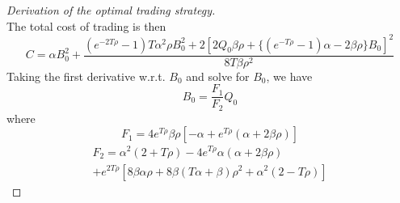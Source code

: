 \documentclass{article}
\begin{document}
\begin{proof}[Derivation of the optimal trading strategy]
\[  \]
  The total cost of trading is then
  \[
    C = \alpha B_0^2 + \frac{(e^{-2 T \rho} - 1) T \alpha^2 \rho B_0^2 + 2 [2 Q_0 \beta \rho + \{(e^{-T \rho} - 1) \alpha - 2 \beta \rho\} B_0]^2}{8 T \beta \rho^2}
  \]
  Taking the first derivative w.r.t. $B_0$ and solve for $B_0$, we have
  \[
    B_0 = \frac{F_1}{F_2} Q_0
  \]
  where
  \[
    F_1 = 4 e^{T \rho} \beta \rho [-\alpha + e^{T \rho} (\alpha + 2 \beta \rho)]
  \]
  \[
    \begin{split}
      F_2 = \alpha^2 (2 + T \rho) - 4 e^{T \rho} \alpha (\alpha + 2 \beta \rho)\ \\
      + e^{2 T \rho} [8 \beta \alpha \rho + 8 \beta (T \alpha + \beta) \rho^2 + \alpha^2 (2 - T \rho)]
    \end{split}
  \]
\end{proof}



\end{document}
